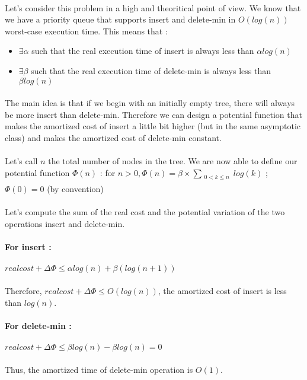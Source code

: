 \paragraph{}
Let's consider this problem in a high and theoritical point of view. We know that we have a priority queue that supports insert and delete-min in $O(log(n))$ worst-case execution time. This means that :
\begin{itemize}
	\item $\exists \alpha$ such that the real execution time of insert is always less than $\alpha log(n)$
	\item $\exists \beta$ such that the real execution time of delete-min is always less than $\beta log(n)$
\end{itemize}
\paragraph{}
The main idea is that if we begin with an initially empty tree, there will always be more insert than delete-min. Therefore we can design a potential function that makes the amortized cost of insert a little bit higher (but in the same asymptotic class) and makes the amortized cost of delete-min constant.
\paragraph{}
Let's call $n$ the total number of nodes in the tree. We are now able to define our potential function $\Phi(n)$ :
for $ n > 0, \Phi(n) = \beta \times \sum_{\substack{0<k\leqslant n \\}}log(k)   $ ; $ \Phi(0) = 0 $ (by convention)

\paragraph{}
Let's compute the sum of the real cost and the potential variation of the two operations insert and delete-min.

\paragraph{For insert :}
\paragraph{}
$real cost + \Delta\Phi \leqslant \alpha log(n) + \beta(log(n+1))$

\paragraph{}
Therefore, $real cost + \Delta\Phi \leqslant O(log(n))$, the amortized cost of insert is less than $log(n)$.

\paragraph{For delete-min  :}
\paragraph{}
$real cost + \Delta\Phi \leqslant \beta log(n) - \beta log(n) =  0$

\paragraph{}
Thus, the amortized time of delete-min operation is $O(1)$.
